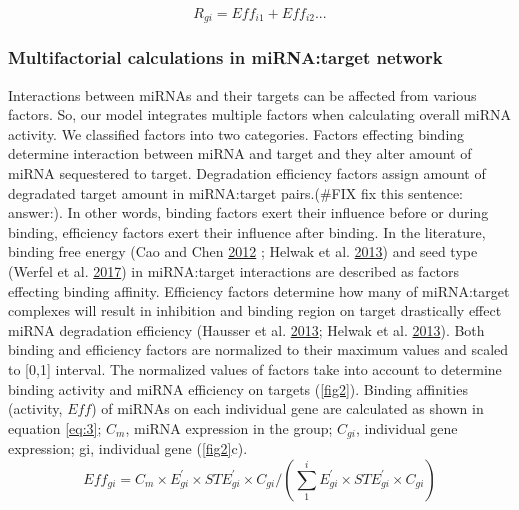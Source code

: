 \documentclass[]{article}
\begin{document}
\begin{equation}
   R_{gi}= Eff_{i1} + Eff_{i2} ... \tag{2}\label{eq:2}
\end{equation}

\hypertarget{multifactorial-calculations-in-mirnatarget-network}{%
\subsubsection{Multifactorial calculations in miRNA:target
network}\label{multifactorial-calculations-in-mirnatarget-network}}

Interactions between miRNAs and their targets can be affected from
various factors. So, our model integrates multiple factors when
calculating overall miRNA activity. We classified factors into two
categories. Factors effecting binding determine interaction between
miRNA and target and they alter amount of miRNA sequestered to target.
Degradation efficiency factors assign amount of degradated target amount
in miRNA:target pairs.(\#FIX fix this sentence: answer:). In other
words, binding factors exert their influence before or during binding,
efficiency factors exert their influence after binding. In the
literature, binding free energy (Cao and Chen
\protect\hyperlink{ref-cao_predicting_2012}{2012} ; Helwak et al.
\protect\hyperlink{ref-helwak_mapping_2013}{2013}) and seed type (Werfel
et al. \protect\hyperlink{ref-werfel_preferential_2017}{2017}) in
miRNA:target interactions are described as factors effecting binding
affinity. Efficiency factors determine how many of miRNA:target
complexes will result in inhibition and binding region on target
drastically effect miRNA degradation efficiency (Hausser et al.
\protect\hyperlink{ref-hausser_analysis_2013}{2013}; Helwak et al.
\protect\hyperlink{ref-helwak_mapping_2013}{2013}). Both binding and
efficiency factors are normalized to their maximum values and scaled to
{[}0,1{]} interval. The normalized values of factors take into account
to determine binding activity and miRNA efficiency on targets
(\autoref{fig2}). Binding affinities (activity, \(Eff\)) of miRNAs on
each individual gene are calculated as shown in equation \eqref{eq:3};
\(C_m\), miRNA expression in the group; \(C_{gi}\), individual gene
expression; gi, individual gene (\autoref{fig2}c). \begin{equation}
Eff_{gi}= C_m \times E^\prime_{gi} \times STE^\prime_{gi} \times C_{gi}/(\sum_{1}^{i} E^\prime_{gi} \times STE^\prime_{gi} \times C_{gi}) \tag{3}\label{eq:3}
\end{equation}
\end{document}
